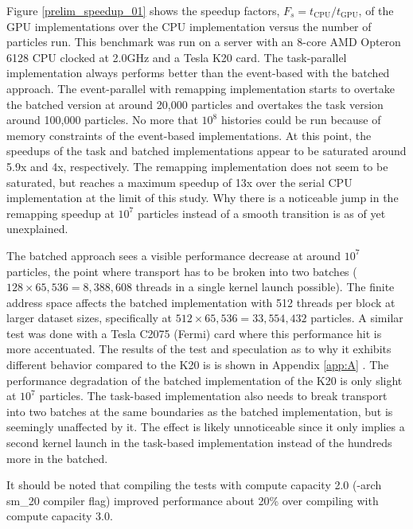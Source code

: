 Figure \ref{prelim_speedup_01} shows the speedup factors, $F_s=t_\mathrm{CPU}/t_\mathrm{GPU}$, of the GPU implementations over the CPU implementation versus the number of particles run.  This benchmark was run on a server with an 8-core AMD Opteron 6128 CPU clocked at 2.0GHz and a Tesla K20 card.  The task-parallel implementation always performs better than the event-based with the batched approach. The event-parallel with remapping implementation starts to overtake the batched version at around 20,000 particles and overtakes the task version around 100,000 particles.  No more that $10^8$ histories could be run because of memory constraints of the event-based implementations.  At this point, the speedups of the task and batched implementations appear to be saturated around 5.9x and 4x, respectively.  The remapping implementation does not seem to be saturated, but reaches a maximum speedup of 13x over the serial CPU implementation at the limit of this study.  Why there is a noticeable jump in the remapping speedup at $10^7$ particles instead of a smooth transition is as of yet unexplained.

The batched approach sees a visible performance decrease at around $10^7$ particles, the point where transport has to be broken into two batches ($128\times65,536=8,388,608$ threads in a single kernel launch possible).  The finite address space affects the batched implementation with 512 threads per block at larger dataset sizes, specifically %
 at $512\times65,536=33,554,432$ particles. 
 A similar test was done with a Tesla C2075 (Fermi) card where this performance hit is more accentuated.  The results of the test and speculation as to why it exhibits different behavior compared to the K20 is %
 is shown in Appendix \ref{app:A} .  
 The performance degradation of the batched implementation of the K20 is only slight at $10^7$ particles.   The task-based implementation also needs to break transport into two batches at the same boundaries as the batched implementation, but is seemingly unaffected by it.  The effect is likely unnoticeable since it only implies a second kernel launch in the task-based implementation instead of the hundreds more in the batched.

It should be noted that compiling the tests with compute capacity 2.0 (-arch sm\_20 compiler flag) improved performance about 20\% over compiling with compute capacity 3.0. 

